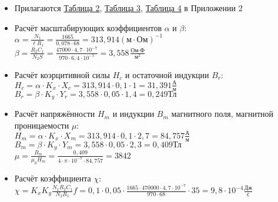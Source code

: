 \begin{itemize}
    \item Прилагаются \hyperlink{table2}{Таблица 2}, \hyperlink{table2}{Таблица 3}, \hyperlink{table2}{Таблица 4}  в Приложении 2

    \smallvspace

    \item Расчёт масштабирующих коэффициентов $\alpha$ и $\beta$: \\
    $\alpha = \frac{N_1}{\ell R_1} = \frac{1665}{0,078 \cdot 68} = 313,914 (\text{м} \cdot \text{Ом})^{-1}$ \\
    $\beta = \frac{R_2 C_1}{N_2 S} = \frac{47000 \cdot 4,7 \cdot 10^{-7}}{970 \cdot 6,4 \cdot 10^{-5}} = 3,558 \frac{\text{Ом} \cdot \text{Ф}}{\text{м}^2}$
    
    \smallvspace

    \item Расчёт коэрцитивной силы $H_c$ и остаточной индукции $B_r$: \\
    $H_c = \alpha \cdot K_x \cdot X_c = 313,914 \cdot 0,1 \cdot 1 = 31,391 \frac{\text{А}}{\text{м}}$ \\
    $B_r = \beta \cdot K_y \cdot Y_r = 3,558 \cdot 0,05 \cdot 1,4 = 0,249 \text{Тл}$

    \smallvspace

    \item Расчёт напряжённости $H_m$ и индукции $B_m$ магнитного поля, магнитной проницаемости $\mu$: \\
    $H_m = \alpha \cdot K_x \cdot X_m = 313,914 \cdot 0,1 \cdot 2,7 = 84,757 \frac{\text{А}}{\text{м}}$ \\
    $B_m = \beta \cdot K_y \cdot Y_m = 3,558 \cdot 0,05 \cdot 2,3 = 0,409 \text{Тл}$ \\
    $\mu = \frac{B_m}{\mu_0 H_m} = \frac{0,409}{4 \cdot \pi \cdot 10^{-7} \cdot 84,757} = 3842$

    \smallvspace

    \item Расчёт коэффициента $\chi$: \\
    $\chi = K_x K_y\frac{N_1 R_2 C_1}{N_2 R_1}f = 0,1 \cdot 0,05 \cdot \frac{1665 \cdot 470000 \cdot 4,7 \cdot 10^{-7}}{970 \cdot 68} \cdot 35 = 9,8 \cdot 10^{-4} \frac{\text{Дж}}{\text{с}}$

    \smallvspace


\end{itemize}
